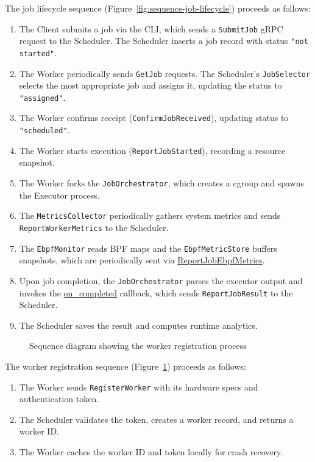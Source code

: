 The job lifecycle sequence (Figure~\ref{fig:sequence-job-lifecycle}) proceeds as follows:
\begin{enumerate}
	\item The Client submits a job via the CLI, which sends a \texttt{SubmitJob} gRPC request to the Scheduler. The Scheduler inserts a job record with status \texttt{"not started"}.
	\item The Worker periodically sends \texttt{GetJob} requests. The Scheduler's \texttt{JobSelector} selects the most appropriate job and assigns it, updating the status to \texttt{"assigned"}.
	\item The Worker confirms receipt (\texttt{ConfirmJobReceived}), updating status to \texttt{"scheduled"}.
	\item The Worker starts execution (\texttt{ReportJobStarted}), recording a resource snapshot.
	\item The Worker forks the \texttt{JobOrchestrator}, which creates a cgroup and spawns the Executor process.
	\item The \texttt{MetricsCollector} periodically gathers system metrics and sends \texttt{ReportWorkerMetrics} to the Scheduler.
	\item The \texttt{EbpfMonitor} reads BPF maps and the \texttt{EbpfMetricStore} buffers snapshots, which are periodically sent via \url{ReportJobEbpfMetrics}.
	\item Upon job completion, the \texttt{JobOrchestrator} parses the executor output and invokes the \url{on_completed} callback, which sends \texttt{ReportJobResult} to the Scheduler.
	\item The Scheduler saves the result and computes runtime analytics.
\end{enumerate}

\begin{figure}[htbp]
	\centering
	\caption{Sequence diagram showing the worker registration process}
	\label{fig:sequence-worker-registration}
\end{figure}

The worker registration sequence (Figure~\ref{fig:sequence-worker-registration}) proceeds as follows:
\begin{enumerate}
	\item The Worker sends \texttt{RegisterWorker} with its hardware specs and authentication token.
	\item The Scheduler validates the token, creates a worker record, and returns a worker ID.
	\item The Worker caches the worker ID and token locally for crash recovery.
\end{enumerate}

